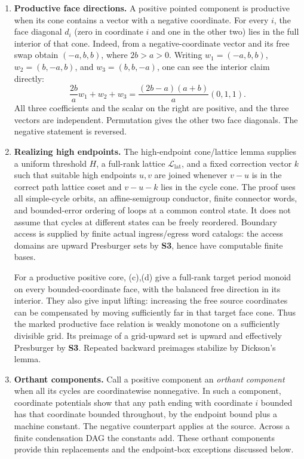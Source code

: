 \documentclass[11pt,a4paper]{article}
\theoremstyle{remark}
\begin{document}
\begin{enumerate}[label=\textup{(\alph*)},leftmargin=*]
\item\label{item:ingredient-c} \textbf{Productive face directions.} A positive pointed component is productive when its cone contains a vector with a negative coordinate. For every \(i\), the face diagonal \(d_i\) (zero in coordinate \(i\) and one in the other two) lies in the full interior of that cone. Indeed, from a negative-coordinate vector and its free swap obtain \((-a,b,b)\), where \(2b>a>0\). Writing
\(w_1=(-a,b,b)\), \(w_2=(b,-a,b)\), and \(w_3=(b,b,-a)\),
one can see the interior claim directly:
\[
 \frac{2b}{a}w_1+w_2+w_3
   =\frac{(2b-a)(a+b)}{a}(0,1,1).
\]
All three coefficients and the scalar on the right are positive, and
the three vectors are independent. Permutation gives the other two
face diagonals. The negative statement is reversed.

\item\label{item:ingredient-d} \textbf{Realizing high endpoints.} The high-endpoint cone/lattice lemma supplies a uniform threshold \(H\), a full-rank lattice \(\mathcal L_{\mathrm{lat}}\), and a fixed correction vector \(k\) such that suitable high endpoints \(u,v\) are joined whenever \(v-u\) is in the correct path lattice coset and \(v-u-k\) lies in the cycle cone. The proof uses all simple-cycle orbits, an affine-semigroup conductor, finite connector words, and bounded-error ordering of loops at a common control state. It does not assume that cycles at different states can be freely reordered. Boundary access is supplied by finite actual ingress/egress word catalogs: the access domains are upward Presburger sets by \textbf{S3}, hence have computable finite bases.

For a productive positive core, (c),(d) give a full-rank target period monoid on every bounded-coordinate face, with the balanced free direction in its interior. They also give input lifting: increasing the free source coordinates can be compensated by moving sufficiently far in that target face cone. Thus the marked productive face relation is weakly monotone on a sufficiently divisible grid. Its preimage of a grid-upward set is upward and effectively Presburger by \textbf{S3}. Repeated backward preimages stabilize by Dickson's lemma.

\item\label{item:ingredient-e} \textbf{Orthant components.} Call a positive component an \emph{orthant component} when all its cycles are coordinatewise nonnegative. In such a component, coordinate potentials show that any path ending with coordinate \(i\) bounded has that coordinate bounded throughout, by the endpoint bound plus a machine constant. The negative counterpart applies at the source. Across a finite condensation DAG the constants add. These orthant components provide thin replacements and the endpoint-box exceptions discussed below.


\end{enumerate}
\end{document}
